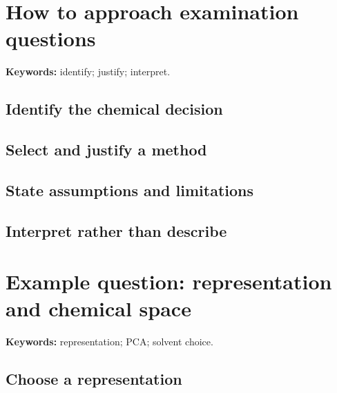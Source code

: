 
\section{How to approach examination questions}

\begin{methodbox}
\textbf{Keywords:} identify; justify; interpret.
\end{methodbox}

\subsection{Identify the chemical decision}


\subsection{Select and justify a method}


\subsection{State assumptions and limitations}


\subsection{Interpret rather than describe}


\section{Example question: representation and chemical space}

\begin{resultbox}
\textbf{Keywords:} representation; PCA; solvent choice.
\end{resultbox}

\subsection{Choose a representation}

